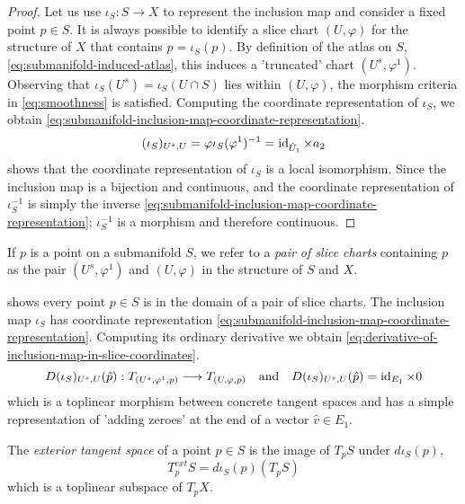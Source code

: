 \documentclass[../main-v2-manifolds.tex]{subfiles}
\begin{document}
\begin{proof}
    Let us use $\iota_{S}: S\to X$ to represent the inclusion map and consider a fixed point $p\in S$. It is always possible to identify a slice chart $(U,\varphi)$ for the structure of $X$ that contains $p =\iota_S(p)$. By definition of the atlas on $S$, \cref{eq:submanifold-induced-atlas}, this induces a 'truncated' chart $(U^s,\varphi^1)$. \\
    
    Observing that $\iota_S(U^s) = \iota_S(U\cap S)$ lies within $(U,\varphi)$, the morphism criteria in \cref{eq:smoothness} is satisfied. Computing the coordinate representation of $\iota_S$, we obtain \cref{eq:submanifold-inclusion-map-coordinate-representation}.
    \begin{equation}\label{eq:submanifold-inclusion-map-coordinate-representation}
        (\iota_S)_{U^s,U} = \varphi\iota_S(\varphi^1)^{-1} = \operatorname{id}_{\hat{U}_1}\times a_2
    \end{equation}
     shows that the coordinate representation of $\iota_S$ is a local isomorphism. Since the inclusion map is a bijection and continuous, and the coordinate representation of $\iota_S^{-1}$ is simply the inverse \cref{eq:submanifold-inclusion-map-coordinate-representation}; $\iota_S^{-1}$ is a morphism and therefore continuous.
\end{proof}
%
%
\begin{remark}\label{rmk:pairs-of-slice-charts}
    If $p$ is a point on a submanifold $S$, we refer to a \emph{pair of slice charts} containing $p$ as the pair $(U^s,\varphi^1)$ and $(U,\varphi)$ in the structure of $S$ and $X$. 
\end{remark}
%
%
 shows every point $p\in S$ is in the domain of a pair of slice charts. The inclusion map $\iota_S$ has coordinate representation \cref{eq:submanifold-inclusion-map-coordinate-representation}. Computing its ordinary derivative we obtain \cref{eq:derivative-of-inclusion-map-in-slice-coordinates}.
\begin{equation}\label{eq:derivative-of-inclusion-map-in-slice-coordinates}
    D(\iota_S)_{U^s,U}(\hat{p}): T_{(U^s,\varphi^1,p)}\longrightarrow T_{(U,\varphi,p)}\qqtext{and} D(\iota_S)_{U^s,U}(\hat{p}) = \id{E_1}\times 0
\end{equation}
%
which is a toplinear morphism between concrete tangent spaces and has a simple representation of 'adding zeroes' at the end of a vector $\hat{v}\in E_1$. 
%
\begin{definition}
    The \emph{exterior tangent space} of a point $p\in S$ is the image of $T_p S$ under $d\iota_S(p)$,
    \begin{equation}\label{eq:exterior-tangent-space}
        T_p^{ext}S = d\iota_S(p)(T_p S)
    \end{equation}
    which is a toplinear subspace of $T_p X$. 
\end{definition}
\end{document}

